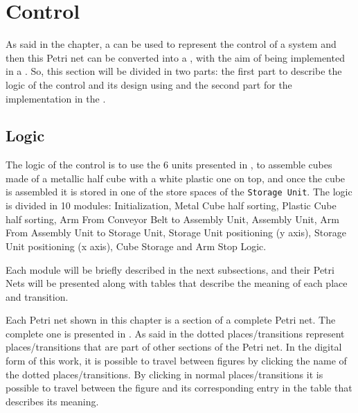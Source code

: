 
\chapter{Control}
\label{cha:control}

As said in the  chapter, a \CIPN{} can be used to
represent the control of a system and then this Petri net can be converted into
a \LD{}, with the aim of being implemented in a \PLC. So, this section will be divided in two
parts: the first part to describe the logic of the control and its design using \CIPN{} and
the second part for the implementation in the \PLC.

\section{Logic}
The logic of the control is to use the 6 units presented in
, to assemble cubes made of a metallic half cube with a
white plastic one on top, and once the cube is assembled it is stored in one of
the store spaces of the \verb|Storage Unit|. 
The logic is divided in 10 modules:
 Initialization, Metal Cube half sorting, Plastic Cube half sorting, Arm From
 Conveyor Belt to Assembly Unit, Assembly Unit, Arm From Assembly Unit to
 Storage Unit, Storage Unit positioning (y axis), Storage Unit positioning (x
 axis), Cube Storage and Arm Stop Logic.

Each module will be briefly described in the next subsections, and their Petri
Nets will be presented along with tables that describe the meaning of each place
and transition.

\begin{observation}
  Each Petri net shown in this chapter is a section of a complete Petri net.
  The complete one is presented in . As said
in  the dotted places\slash transitions represent places\slash transitions that are part of other sections of the Petri net. In the
digital form of this work, it is possible to travel between figures by clicking
the name of the dotted places\slash transitions. By clicking in normal
places\slash transitions it is possible to travel between the figure and its
corresponding entry in the table that describes its meaning.
  
\end{observation}
